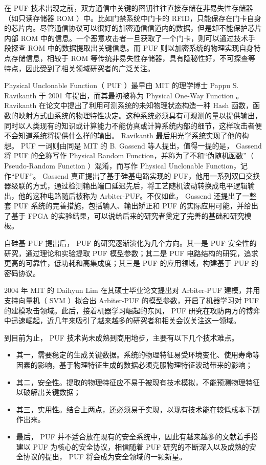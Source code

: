 在 PUF 技术出现之前，双方通信中关键的密钥往往直接存储在非易失性存储器（如只读存储器 ROM ）中。比如门禁系统中门卡的 RFID，只能保存在门卡自身的芯片内。尽管通信协议可以很好的加密通信信道内的数据，但是却不能保护芯片内部 ROM 中的信息。一个恶意攻击者一旦获取了一个门卡，则可以通过技术手段探查 ROM 中的数据提取出关键信息。而 PUF 则以加密系统的物理实现自身特点存储信息，相较于 ROM 等传统非易失性存储器，具有隐秘性好，不可探查等特点，因此受到了相关领域研究者的广泛关注。


Physical Unclonable Function（ PUF ）最早由 MIT 的理学博士 Pappu S. Ravikanth 于 2001 年提出\supercite{pappu2002physical}，而其最初被称为 Physical One-Way Function 。 Ravikanth 在论文中提出了利用可测系统的未知物理状态构造一种 Hash 函数，函数的映射方式由系统的物理特性决定。这种系统必须具有可观测的量以提供输出，同时以人类现有的知识或计算能力不能仿真或计算系统内部的细节，这样攻击者便不会知道系统将提供什么样的输出。 Ravikanth 最后用光学系统实现了他的构想。 PUF 一词则由同是 MIT 的 B. Gassend 等人提出\supercite{gassend2002silicon}，值得一提的是， Gassend 将 PUF 的全称写作 Physical Random Function，并称为了不和``伪随机函数''（ Pseudo-Random Function ）混淆，而写作 Physical Unclonable Function，记作``PUF''。 Gassend 真正提出了基于硅基电路实现的 PUF，他用一系列双口交换器级联的方式，通过检测输出端口延迟先后，将工艺随机波动转换成电平逻辑输出，他的这种电路随后被称为 Arbiter-PUF。不仅如此， Gassend 还提出了一整套 PUF 系统的完善措施，包括输入、输出矫正和 PUF 的实际应用可能，并给出了基于 FPGA 的实验结果，可以说给后来的研究者奠定了完善的基础和研究模板。

自硅基 PUF 提出后， PUF 的研究逐渐演化为几个方向。其一是 PUF 安全性的研究，通过理论和实验提取 PUF 模型参数；其二是 PUF 电路结构的研究，追求更高的可靠性，低功耗和高集成度；其三是 PUF 的应用领域，构建基于 PUF 的密码协议。

2004 年 MIT 的 Daihyun Lim 在其硕士毕业论文\supercite{lim2005extracting}提出对 Arbiter-PUF 建模，并用支持向量机（ SVM ）拟合出 Arbiter-PUF 的模型参数，开启了机器学习对 PUF 的建模攻击领域。此后，接着机器学习崛起的东风， PUF 研究在攻防两方的博弈中迅速崛起，近几年来吸引了越来越多的研究者和相关会议关注这一领域。

到目前为止， PUF 技术尚未成熟到商用地步，主要有以下几个技术难点。
\begin{itemize}
\item 其一，需要稳定的生成关键数据。系统的物理特征易受环境变化、使用寿命等因素的影响，基于物理特征生成的数据必须克服物理特征波动带来的影响；
\item 其二，安全性。提取的物理特征应不易于被现有技术模拟，不能预测物理特征以破解出关键数据；
\item 其三，实用性。结合上两点，还必须易于实现，以现有技术能在较低成本下制作出来。
\item 最后， PUF 并不适合放在现有的安全系统中，因此有越来越多的文献着手搭建以 PUF 为核心的安全协议，相信随着 PUF 研究的不断深入以及成熟的安全协议的提出， PUF 将会成为安全领域的一颗新星。
\end{itemize}

